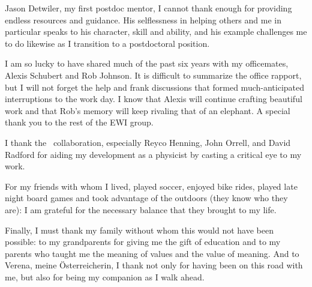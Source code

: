 {Jason Detwiler, my first postdoc mentor, I cannot thank enough for providing
endless resources and guidance.  His selflessness in helping others and me in
particular speaks to his character, skill and ability, and his example
challenges me to do likewise as I transition to a postdoctoral position. 

I am so lucky to have shared much of the past six years with my officemates,
Alexis Schubert and Rob Johnson.  It is difficult to summarize the office
rapport, but I will not forget the help and frank discussions that formed
much-anticipated interruptions to the work day.  I know that Alexis will continue
crafting beautiful work and that Rob's memory will keep rivaling that
of an elephant.  A special thank you to the rest of the EWI group.

I thank the \MJ~collaboration, especially Reyco Henning, John Orrell, and David
Radford for aiding my development as a physicist by casting a critical eye to
my work. 

For my friends with whom I lived, played soccer, enjoyed bike rides, played
late night board games and took advantage of the outdoors (they know who they are): I am grateful for
the necessary balance that they brought to my life.

Finally, I must thank my family without whom this would not have been possible: to my
grandparents for giving me the gift of education and to my parents who taught
me the meaning of values and the value of meaning.  And to Verena, meine
\"{O}sterreicherin, I thank not only for having been on this road with me, but
also for being my companion as I walk ahead.  
}


